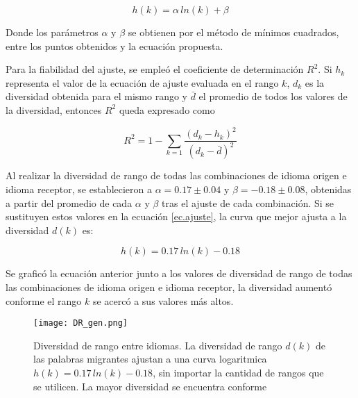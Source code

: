 \begin{equation}
\label{ec.ajuste}
h(k) =  \alpha \, ln(k) + \beta
\end{equation}

Donde los parámetros $\alpha$ y $\beta$  se  obtienen por el método de mínimos cuadrados, entre los puntos obtenidos y la ecuación propuesta.  



Para la fiabilidad del ajuste, se empleó el coeficiente de determinación $R^{2}$. Si $h_{k}$  representa el  valor de la ecuación de ajuste evaluada en el rango $k$,  $d_{k}$ es la diversidad obtenida para el mismo rango y $\bar{d}$ el promedio de todos los valores de la diversidad, entonces $R^{2}$ queda expresado como

\begin{equation}
\label{ec.r2_diversidad}
R^{2} = 1 - \sum_{k = 1} \frac{ \left( d_{k} - h_{k} \right)^{2}  }{ \left( d_{k} - \bar{d} \right)^{2} }	
\end{equation}

Al realizar la diversidad de rango de todas las combinaciones de idioma origen e idioma receptor,  se establecieron a $\alpha = 0.17\pm 0.04$ y $\beta = -0.18 \pm 0.08$, obtenidas a partir del promedio de cada $\alpha$ y $\beta$ tras el ajuste de cada combinación.  Si se sustituyen estos valores en la ecuación \ref{ec.ajuste}, la curva que mejor ajusta a la diversidad $d(k)$ es:


\begin{equation}
\label{ec.gen_ajs}
h(k) = 0.17\,ln(k) - 0.18
\end{equation} 

Se graficó la ecuación anterior junto a los valores de diversidad de rango de todas las combinaciones de idioma origen e idioma receptor, la diversidad aumentó conforme el rango $k$ se acercó a sus valores más altos.



\begin{figure}[h!]
	\centering
	\texttt{[image: DR\_gen.png]}
	\label{fig.DR_gen}
	\caption{Diversidad de rango entre idiomas. La diversidad de rango $d(k)$ de las palabras migrantes ajustan a una curva logaritmica $h(k) = 0.17\,ln(k) - 0.18$, sin importar la cantidad de rangos que se utilicen. La mayor diversidad se encuentra conforme }
\end{figure}


